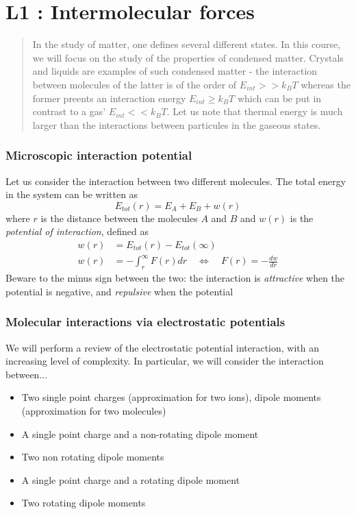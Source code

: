 \documentclass[../phys-f308.tex]{subfiles}
\begin{document}
    \part{L1 : Intermolecular forces}
    \begin{abstract}
        In the study of matter, one defines several different states. In this course, we will focus on the study of the properties of condensed matter. Crystals and liquids are examples of such condensed matter - the interaction between molecules of the latter is of the order of $E_{int}>> k_BT$ whereas the former preents an interaction energy $E_{int}\geq k_BT$ which can be put in contrast to a gas' $E_{int}<< k_BT$. Let us note that thermal energy is much larger than the interactions between particules in the gaseous states. 
    \end{abstract}

    \section{Microscopic interaction potential}

    Let us consider the interaction between two different molecules. The total energy in the system can be written as
    \begin{equation}
        E_{tot}(r) = E_A+E_B+w(r)
    \end{equation}
    where $r$ is the distance between the molecules $A$ and $B$ and $w(r)$ is the \emph{potential of interaction}, defined as
    \begin{align}
        w(r) &= E_{tot}(r) - E_{tot}(\infty)\\
        w(r) &= -\int_r^{\infty}F(r)dr \quad \Leftrightarrow \quad F(r) = -\frac{dw}{dr}\label{eq: F dw/dr}
    \end{align}
    Beware to the minus sign between the two: the interaction is \emph{attractive} when the potential is negative, and \emph{repulsive} when the potential   

    \section{Molecular interactions via electrostatic potentials}

    We will perform a review of the electrostatic potential interaction, with an increasing level of complexity. In particular, we will consider the interaction between...
    \begin{itemize}
        \item Two single point charges (approximation for two ions), dipole moments (approximation for two molecules)
        \item A single point charge and a non-rotating dipole moment
        \item Two non rotating dipole moments
        \item A single point charge and a rotating dipole moment
        \item Two rotating dipole moments
    \end{itemize}
\end{document}
